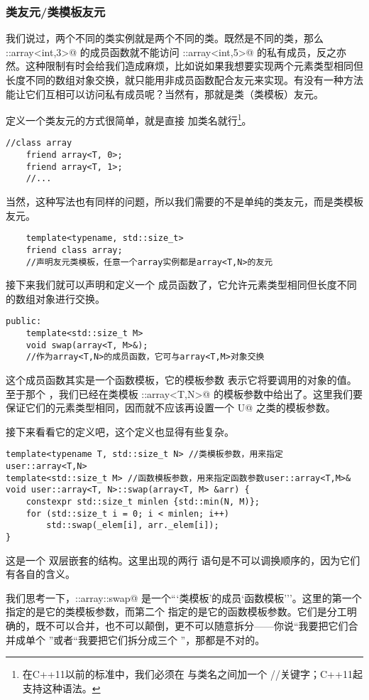 \subsubsection*{类友元/类模板友元}
我们说过，两个不同的类实例就是两个不同的类。既然是不同的类，那么 \lstinline@user::array<int,3>@ 的成员函数就不能访问 \lstinline@user::array<int,5>@ 的私有成员，反之亦然。这种限制有时会给我们造成麻烦，比如说如果我想要实现两个元素类型相同但长度不同的数组对象交换，就只能用非成员函数配合友元来实现。有没有一种方法能让它们互相可以访问私有成员呢？当然有，那就是类（类模板）友元。\par
定义一个类友元的方式很简单，就是直接 \lstinline@friend@ 加类名就行\footnote{在C++11以前的标准中，我们必须在 \lstinline@friend@ 与类名之间加一个 \lstinline@class@/\lstinline@struct@/\lstinline@union@ 关键字；C++11起支持这种语法。}。
\begin{lstlisting}
//class array
    friend array<T, 0>;
    friend array<T, 1>;
    //...
\end{lstlisting}\par
当然，这种写法也有同样的问题，所以我们需要的不是单纯的类友元，而是类模板友元。
\begin{lstlisting}
    template<typename, std::size_t>
    friend class array;
    //声明友元类模板，任意一个array实例都是array<T,N>的友元
\end{lstlisting}
接下来我们就可以声明和定义一个 \lstinline@swap@ 成员函数了，它允许元素类型相同但长度不同的数组对象进行交换。
\begin{lstlisting}
public:
    template<std::size_t M>
    void swap(array<T, M>&);
    //作为array<T,N>的成员函数，它可与array<T,M>对象交换
\end{lstlisting}
这个成员函数其实是一个函数模板，它的模板参数 \lstinline@M@ 表示它将要调用的对象的值。至于那个 \lstinline@T@，我们已经在类模板 \lstinline@user::array<T,N>@ 的模板参数中给出了。这里我们要保证它们的元素类型相同，因而就不应该再设置一个 \lstinline@typename U@ 之类的模板参数。\par
接下来看看它的定义吧，这个定义也显得有些复杂。
\begin{lstlisting}
template<typename T, std::size_t N> //类模板参数，用来指定user::array<T,N>
template<std::size_t M> //函数模板参数，用来指定函数参数user::array<T,M>&
void user::array<T, N>::swap(array<T, M> &arr) {
    constexpr std::size_t minlen {std::min(N, M)};
    for (std::size_t i = 0; i < minlen; i++)
        std::swap(_elem[i], arr._elem[i]);
}
\end{lstlisting}
这是一个 \lstinline@template@ 双层嵌套的结构。这里出现的两行 \lstinline@template@ 语句是不可以调换顺序的，因为它们有各自的含义。\par
我们思考一下，\lstinline@user::array::swap@ 是一个```类模板'的成员`函数模板'''。这里的第一个\linebreak\lstinline@template@ 指定的是它的类模板参数，而第二个 \lstinline@template@ 指定的是它的函数模板参数。它们是分工明确的，既不可以合并，也不可以颠倒，更不可以随意拆分——你说``我要把它们合并成单个 \lstinline@template@''或者``我要把它们拆分成三个 \lstinline@template@''，那都是不对的。\par
